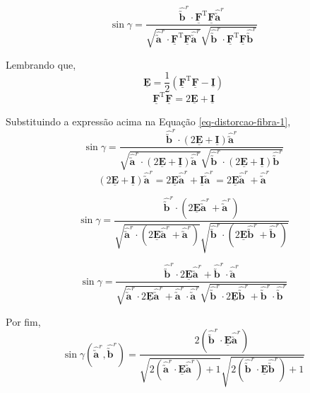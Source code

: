 	\begin{equation}\label{eq-distorcao-fibra-1}
		\sin\gamma=\frac{\hat{\utilde{\mathbf{b}}}^r\cdot\underline{\mathbf{F}}^{\text{T}}\underline{\mathbf{F}}\hat{\utilde{\mathbf{a}}}^r}{\sqrt{\hat{\utilde{\mathbf{a}}}^r\cdot\underline{\mathbf{F}}^{\text{T}}\underline{\mathbf{F}}\hat{\utilde{\mathbf{a}}}^r}\sqrt{\hat{\utilde{\mathbf{b}}}^r\cdot\underline{\mathbf{F}}^{\text{T}}\underline{\mathbf{F}}\hat{\utilde{\mathbf{b}}}^r}}
	\end{equation}		

	Lembrando que,
	\[\underline{\mathbf{E}}=\frac{1}{2}(\underline{\mathbf{F}}^{\text{T}}\underline{\mathbf{F}}-\underline{\mathbf{I}})\]
	\[\underline{\mathbf{F}}^{\text{T}}\underline{\mathbf{F}}=2\underline{\mathbf{E}}+\underline{\mathbf{I}}\]
	
	Substituindo a expressão acima na Equação \eqref{eq-distorcao-fibra-1},
	\[\sin\gamma=\frac{\hat{\utilde{\mathbf{b}}}^r\cdot(2\underline{\mathbf{E}}+\underline{\mathbf{I}})\hat{\utilde{\mathbf{a}}}^r}{\sqrt{\hat{\utilde{\mathbf{a}}}^r\cdot(2\underline{\mathbf{E}}+\underline{\mathbf{I}})\hat{\utilde{\mathbf{a}}}^r}\sqrt{\hat{\utilde{\mathbf{b}}}^r\cdot(2\underline{\mathbf{E}}+\underline{\mathbf{I}})\hat{\utilde{\mathbf{b}}}^r}}\]
	\[(2\underline{\mathbf{E}}+\underline{\mathbf{I}})\hat{\utilde{\mathbf{a}}}^r=2\underline{\mathbf{E}}\hat{\utilde{\mathbf{a}}}^r+\underline{\mathbf{I}}\hat{\utilde{\mathbf{a}}}^r=2\underline{\mathbf{E}}\hat{\utilde{\mathbf{a}}}^r+\hat{\utilde{\mathbf{a}}}^r\]
	
	\[\sin\gamma=\frac{\hat{\utilde{\mathbf{b}}}^r\cdot(2\underline{\mathbf{E}}\hat{\utilde{\mathbf{a}}}^r+\hat{\utilde{\mathbf{a}}}^r)}{\sqrt{\hat{\utilde{\mathbf{a}}}^r\cdot(2\underline{\mathbf{E}}\hat{\utilde{\mathbf{a}}}^r+\hat{\utilde{\mathbf{a}}}^r)}\sqrt{\hat{\utilde{\mathbf{b}}}^r\cdot(2\underline{\mathbf{E}}\hat{\utilde{\mathbf{b}}}^r+\hat{\utilde{\mathbf{b}}}^r)}}\]
	
	\[\sin\gamma=\frac{\hat{\utilde{\mathbf{b}}}^r\cdot2\underline{\mathbf{E}}\hat{\utilde{\mathbf{a}}}^r+\hat{\utilde{\mathbf{b}}}^r\cdot\hat{\utilde{\mathbf{a}}}^r}{\displaystyle\sqrt{\hat{\utilde{\mathbf{a}}}^r\cdot2\underline{\mathbf{E}}\hat{\utilde{\mathbf{a}}}^r+\hat{\utilde{\mathbf{a}}}^r\cdot\hat{\utilde{\mathbf{a}}}^r}\sqrt{\hat{\utilde{\mathbf{b}}}^r\cdot2\underline{\mathbf{E}}\hat{\utilde{\mathbf{b}}}^r+\hat{\utilde{\mathbf{b}}}^r\cdot\hat{\utilde{\mathbf{b}}}^r}}\]
	
	Por fim,
	\begin{equation}\label{eq-distorcao-fibra-2}
		\sin\gamma(\hat{\utilde{\mathbf{a}}}^r,\hat{\utilde{\mathbf{b}}}^r)=\frac{2(\hat{\utilde{\mathbf{b}}}^r\cdot\underline{\mathbf{E}}\hat{\utilde{\mathbf{a}}}^r)}{\displaystyle\sqrt{2(\hat{\utilde{\mathbf{a}}}^r\cdot\underline{\mathbf{E}}\hat{\utilde{\mathbf{a}}}^r)+1}\sqrt{2(\hat{\utilde{\mathbf{b}}}^r\cdot\underline{\mathbf{E}}\hat{\utilde{\mathbf{b}}}^r)+1}}
	\end{equation}
	
